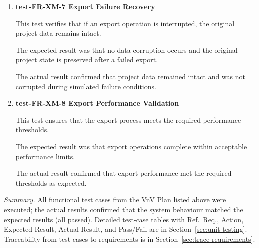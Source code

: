 \documentclass[12pt, titlepage]{article}
\begin{document}
\begin{enumerate}
The test was not executed as this functionality is not applicable in the final system and is therefore considered out of scope.




\item \textbf{test-FR-XM-7 Export Failure Recovery}

\hspace{1.5em} This test verifies that if an export operation is interrupted, the original project data remains intact.

The expected result was that no data corruption occurs and the original project state is preserved after a failed export.

The actual result confirmed that project data remained intact and was not corrupted during simulated failure conditions.

\item \textbf{test-FR-XM-8 Export Performance Validation}

\hspace{1.5em} This test ensures that the export process meets the required performance thresholds.

The expected result was that export operations complete within acceptable performance limits.

The actual result confirmed that export performance met the required thresholds as expected.


\end{enumerate}

\medskip
\noindent\textit{Summary.} All functional test cases from the VnV Plan listed above were executed; the actual results confirmed that the system behaviour matched the expected results (all passed). Detailed test-case tables with Ref.\ Req., Action, Expected Result, Actual Result, and Pass/Fail are in Section~\ref{sec:unit-testing}. Traceability from test cases to requirements is in Section~\ref{sec:trace-requirements}.
\end{document}
